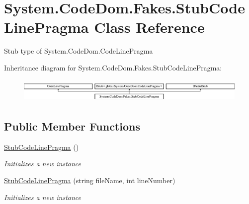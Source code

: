 \hypertarget{class_system_1_1_code_dom_1_1_fakes_1_1_stub_code_line_pragma}{\section{System.\-Code\-Dom.\-Fakes.\-Stub\-Code\-Line\-Pragma Class Reference}
\label{class_system_1_1_code_dom_1_1_fakes_1_1_stub_code_line_pragma}
}


Stub type of System.\-Code\-Dom.\-Code\-Line\-Pragma 


Inheritance diagram for System.\-Code\-Dom.\-Fakes.\-Stub\-Code\-Line\-Pragma\-:\begin{figure}[H]
\begin{center}
\leavevmode
\includegraphics[height=1.204301cm]{class_system_1_1_code_dom_1_1_fakes_1_1_stub_code_line_pragma}
\end{center}
\end{figure}
\subsection*{Public Member Functions}
\begin{DoxyCompactItemize}
\item 
\hyperlink{class_system_1_1_code_dom_1_1_fakes_1_1_stub_code_line_pragma_ac92fbe36b5ddf4a852a0c0767b314788}{Stub\-Code\-Line\-Pragma} ()
\begin{DoxyCompactList}\small\item\em Initializes a new instance\end{DoxyCompactList}\item 
\hyperlink{class_system_1_1_code_dom_1_1_fakes_1_1_stub_code_line_pragma_a13f72d0f362f9d0adcc5589c89ec766d}{Stub\-Code\-Line\-Pragma} (string file\-Name, int line\-Number)
\begin{DoxyCompactList}\small\item\em Initializes a new instance\end{DoxyCompactList}\end{DoxyCompactItemize}
